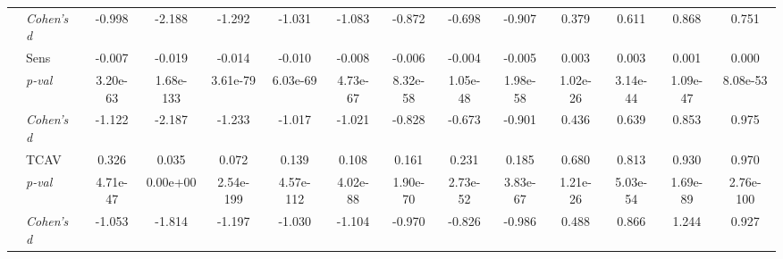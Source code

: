 \begin{table}[ht]
{\begin{tabular}{llcccccccccccc}
 & \footnotesize\color{gray}\textit{Cohen's d} & \footnotesize\color{gray}-0.998 & \footnotesize\color{gray}-2.188 & \footnotesize\color{gray}-1.292 & \footnotesize\color{gray}-1.031 & \footnotesize\color{gray}-1.083 & \footnotesize\color{gray}-0.872 & \footnotesize\color{gray}-0.698 & \footnotesize\color{gray}-0.907 & \footnotesize\color{gray}0.379 & \footnotesize\color{gray}0.611 & \footnotesize\color{gray}0.868 & \footnotesize\color{gray}0.751 \\
 \cmidrule(l){2-14}
 & Sens & -0.007 & -0.019 & -0.014 & -0.010 & -0.008 & -0.006 & -0.004 & -0.005 & 0.003 & 0.003 & 0.001 & 0.000 \\
 & \footnotesize\color{gray}\textit{p-val} & \footnotesize\color{gray}3.20e-63 & \footnotesize\color{gray}1.68e-133 & \footnotesize\color{gray}3.61e-79 & \footnotesize\color{gray}6.03e-69 & \footnotesize\color{gray}4.73e-67 & \footnotesize\color{gray}8.32e-58 & \footnotesize\color{gray}1.05e-48 & \footnotesize\color{gray}1.98e-58 & \footnotesize\color{gray}1.02e-26 & \footnotesize\color{gray}3.14e-44 & \footnotesize\color{gray}1.09e-47 & \footnotesize\color{gray}8.08e-53 \\
 & \footnotesize\color{gray}\textit{Cohen's d} & \footnotesize\color{gray}-1.122 & \footnotesize\color{gray}-2.187 & \footnotesize\color{gray}-1.233 & \footnotesize\color{gray}-1.017 & \footnotesize\color{gray}-1.021 & \footnotesize\color{gray}-0.828 & \footnotesize\color{gray}-0.673 & \footnotesize\color{gray}-0.901 & \footnotesize\color{gray}0.436 & \footnotesize\color{gray}0.639 & \footnotesize\color{gray}0.853 & \footnotesize\color{gray}0.975 \\
 \cmidrule(l){2-14}
 & TCAV & 0.326 & 0.035 & 0.072 & 0.139 & 0.108 & 0.161 & 0.231 & 0.185 & 0.680 & 0.813 & 0.930 & 0.970 \\
 & \footnotesize\color{gray}\textit{p-val} & \footnotesize\color{gray}4.71e-47 & \footnotesize\color{gray}0.00e+00 & \footnotesize\color{gray}2.54e-199 & \footnotesize\color{gray}4.57e-112 & \footnotesize\color{gray}4.02e-88 & \footnotesize\color{gray}1.90e-70 & \footnotesize\color{gray}2.73e-52 & \footnotesize\color{gray}3.83e-67 & \footnotesize\color{gray}1.21e-26 & \footnotesize\color{gray}5.03e-54 & \footnotesize\color{gray}1.69e-89 & \footnotesize\color{gray}2.76e-100 \\
 & \footnotesize\color{gray}\textit{Cohen's d} & \footnotesize\color{gray}-1.053 & \footnotesize\color{gray}-1.814 & \footnotesize\color{gray}-1.197 & \footnotesize\color{gray}-1.030 & \footnotesize\color{gray}-1.104 & \footnotesize\color{gray}-0.970 & \footnotesize\color{gray}-0.826 & \footnotesize\color{gray}-0.986 & \footnotesize\color{gray}0.488 & \footnotesize\color{gray}0.866 & \footnotesize\color{gray}1.244 & \footnotesize\color{gray}0.927 \\

\end{tabular}}
\end{table}
